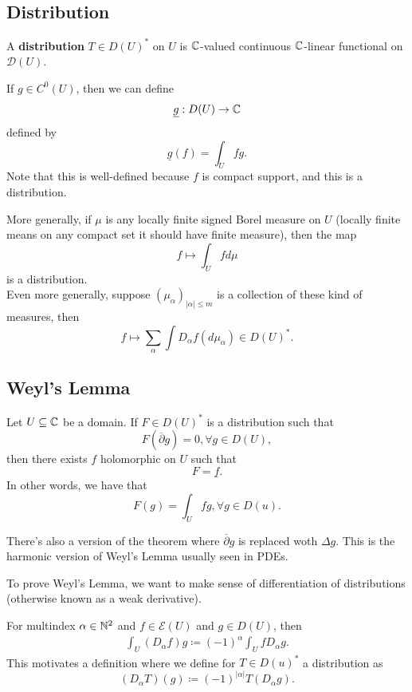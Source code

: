 \documentclass{article}
\begin{document}
{\subsection{Distribution}

\begin{definition}
    A \textbf{distribution} $T \in D(U)^*$ on $U$ is $\mathbb{C}$-valued continuous $\mathbb{C}$-linear functional on $\mathcal{D}(U)$.
\end{definition}

\begin{example}
    If $g \in C^0(U)$, then we can define
    \[\underline{g}: D(U) \to \mathbb{C}\]
    defined by
    \[\underline{g}(f) = \int_{U} fg.\]
    Note that this is well-defined because $f$ is compact support, and this is a distribution.
\end{example}

More generally, if $\mu$ is any locally finite signed Borel measure on $U$ (locally finite means on any compact set it should have finite measure), then the map
\[f \mapsto \int_{U} f d\mu\]
is a distribution.\\

Even more generally, suppose $(\mu_\alpha)_{|\alpha| \leq m}$ is a collection of these kind of measures, then
\[f \mapsto \sum_{\alpha} \int D_\alpha f (d\mu_\alpha) \in D(U)^*.\]

\subsection{Weyl's Lemma}

\begin{theorem}
   Let $U \subseteq \mathbb{C}$ be a domain. If $F \in D(U)^*$ is a distribution such that
   \[F(\overline{\partial}g) = 0, \forall g \in D(U),\]
   then there exists $f $ holomorphic on $U$ such that
   \[F = \underline{f}.\]
   In other words, we have that
   \[F(g) = \int_{U} fg, \forall g \in D(u).\]
\end{theorem}

\begin{remark}
    There's also a version of the theorem where $\overline{\partial} g$ is replaced woth $\Delta g$. This is the harmonic version of Weyl's Lemma usually seen in PDEs.
\end{remark}

To prove Weyl's Lemma, we want to make sense of differentiation of distributions (otherwise known as a weak derivative). 
\begin{definition}
    For multindex $\alpha \in \mathbb{N}^2$ and $f \in \mathcal{E}(U)$ and $g \in D(U)$, then
    \begin{align*}
        \int_{U} (D_\alpha f) g \coloneqq (-1)^\alpha \int_{U} f D_\alpha g \tag*{Repeated Integration By Parts}.
    \end{align*}
    This motivates a definition where we define for $T \in D(u)^*$ a distribution as
    \[(D_\alpha T)(g) \coloneqq (-1)^{|\alpha|} T(D_\alpha g).  \]
\end{definition}

}
\end{document}
